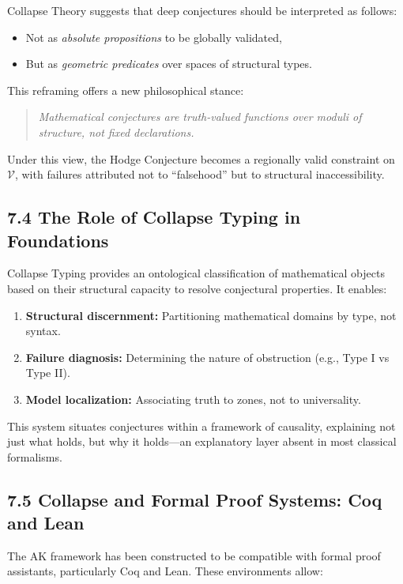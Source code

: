 \documentclass[11pt]{article}
\begin{document}
Collapse Theory suggests that deep conjectures should be interpreted as follows:

\begin{itemize}
  \item Not as \emph{absolute propositions} to be globally validated,
  \item But as \emph{geometric predicates} over spaces of structural types.
\end{itemize}

This reframing offers a new philosophical stance:

\begin{quote}
\emph{Mathematical conjectures are truth-valued functions over moduli of structure, not fixed declarations.}
\end{quote}

Under this view, the Hodge Conjecture becomes a regionally valid constraint on $\mathcal{V}$, with failures attributed not to “falsehood” but to structural inaccessibility.

\subsection{7.4 The Role of Collapse Typing in Foundations}

Collapse Typing provides an ontological classification of mathematical objects based on their structural capacity to resolve conjectural properties. It enables:

\begin{enumerate}
  \item \textbf{Structural discernment:} Partitioning mathematical domains by type, not syntax.
  \item \textbf{Failure diagnosis:} Determining the nature of obstruction (e.g., Type I vs Type II).
  \item \textbf{Model localization:} Associating truth to zones, not to universality.
\end{enumerate}

This system situates conjectures within a framework of causality, explaining not just what holds, but why it holds—an explanatory layer absent in most classical formalisms.

\subsection{7.5 Collapse and Formal Proof Systems: Coq and Lean}

The AK framework has been constructed to be compatible with formal proof assistants, particularly Coq and Lean. These environments allow:
\end{document}
